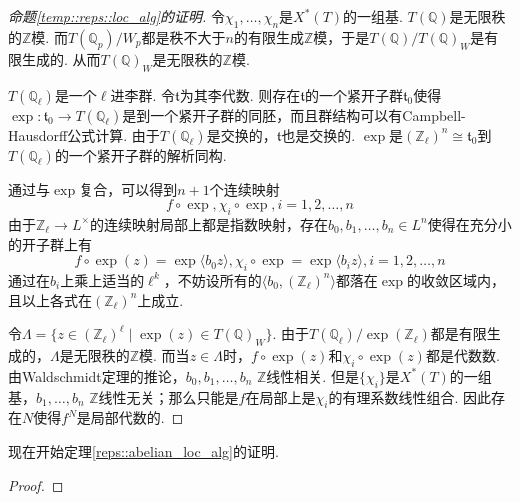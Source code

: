\begin{proof}[命题\ref{temp::reps::loc_alg}的证明]

    令$\chi_1,\ldots,\chi_n$是$X^{*}(T)$的一组基.
    $T(\mathbb{Q})$是无限秩的$\mathbb{Z}$模.
    而$T(\mathbb{Q}_p)/W_p$都是秩不大于$n$的有限生成$\mathbb{Z}$模，于是$T(\mathbb{Q})/T(\mathbb{Q})_W$是有限生成的. 从而$T(\mathbb{Q})_W$是无限秩的$\mathbb{Z}$模.

    $T(\mathbb{Q}_{\ell})$是一个$\ell$进李群. 令$\mathfrak{t}$为其李代数. 则存在$\mathfrak{t}$的一个紧开子群$\mathfrak{t}_0$使得$\exp: \mathfrak{t}_0\to T(\mathbb{Q}_{\ell})$是到一个紧开子群的同胚，而且群结构可以有Campbell-Hausdorff公式计算. 由于$T(\mathbb{Q}_{\ell})$是交换的，$\mathfrak{t}$也是交换的. $\exp$是$(\mathbb{Z}_{\ell})^n\cong \mathfrak{t}_0$到$T(\mathbb{Q}_{\ell})$的一个紧开子群的解析同构.

    通过与$\exp$复合，可以得到$n+1$个连续映射
    \begin{equation}
        f\circ\exp, \chi_i\circ\exp, i=1,2,\ldots,n
    \end{equation}
    由于$\mathbb{Z}_{\ell}\to L^{\times}$的连续映射局部上都是指数映射，存在$b_0, b_1,\ldots,b_n \in L^n$使得在充分小的开子群上有
    \begin{equation}
        f\circ\exp(z) = \exp \langle b_0 z\rangle, \chi_i\circ\exp = \exp\langle b_i z\rangle, i=1,2,\ldots,n
    \end{equation}
    通过在$b_i$上乘上适当的$\ell^k$，不妨设所有的$\langle b_0, (\mathbb{Z}_{\ell})^n\rangle$都落在$\exp$的收敛区域内，且以上各式在$(\mathbb{Z}_{\ell})^n$上成立.

    令$\Lambda = \{z\in (\mathbb{Z}_{\ell})^{\ell}\mid \exp(z)\in T(\mathbb{Q})_{W}\}$. 由于$T(\mathbb{Q}_{\ell})/\exp(\mathbb{Z}_{\ell})$都是有限生成的，$\Lambda$是无限秩的$\mathbb{Z}$模. 而当$z\in \Lambda$时，$f\circ \exp(z)$和$\chi_i\circ\exp(z)$都是代数数. 由Waldschmidt定理的推论，$b_0,b_1,\ldots,b_n$ $\mathbb{Z}$线性相关. 但是$\{\chi_i\}$是$X^{*}(T)$的一组基，$b_1,\ldots,b_n$ $\mathbb{Z}$线性无关；那么只能是$f$在局部上是$\chi_i$的有理系数线性组合. 因此存在$N$使得$f^N$是局部代数的.
\end{proof}

现在开始定理\ref{reps::abelian_loc_alg}的证明.
\begin{proof}
\end{proof}

